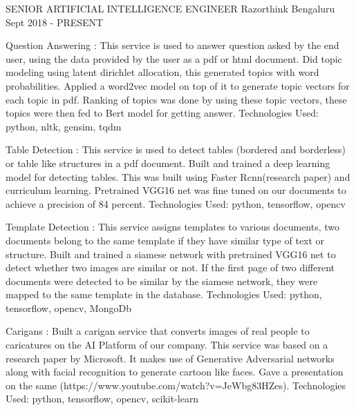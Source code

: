 
\begin{cventries}

  \cventry
    {SENIOR ARTIFICIAL INTELLIGENCE ENGINEER} %
    {Razorthink} %
    {Bengaluru} %
    {Sept 2018 - PRESENT} %
    {
      \begin{cvitems} %
        \item{Question Answering : This service is used to answer question asked by the end user, using the data provided by the user as a pdf or html document. Did topic modeling using latent dirichlet allocation, this generated topics with word probabilities. Applied a word2vec model on top of it to generate topic vectors for each topic in pdf. Ranking of topics was done by using these topic vectors, these topics were then fed to Bert model for getting answer. Technologies Used: python, nltk, gensim, tqdm}        
        \item{Table Detection : This service is used to detect tables (bordered and borderless) or table like structures in a pdf document. Built and trained a deep learning model for detecting tables. This was built using Faster Rcnn(research paper) and curriculum learning. Pretrained VGG16 net was fine tuned on our documents to achieve a precision of 84 percent.  Technologies Used: python, tensorflow, opencv}        
        \item{Template Detection : This service assigns templates to various documents, two documents belong to the same template if they have similar type of text or structure. Built and trained a siamese network with pretrained VGG16 net to detect whether two images are similar or not. If the first page of two different documents were detected to be similar by the siamese network, they were mapped to the same template in the database. Technologies Used: python, tensorflow, opencv, MongoDb}        
        \item{Carigans : Built a carigan service that converts images of real people to caricatures on the AI Platform of our company. This service was based on a research paper by Microsoft. It makes use of Generative Adversarial networks along with facial recognition to generate cartoon like faces. Gave a presentation on the same (https://www.youtube.com/watch?v=JeWbg83HZes). Technologies Used: python, tensorflow, opencv, scikit-learn}     
	\end{cvitems}
    }


\end{cventries}
